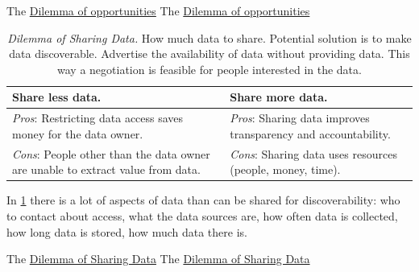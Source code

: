 The \href{table:new-opportunties}{Dilemma of opportunities}
The \href{table:new-opportunties}{Dilemma of opportunities}


\begin{center}
\begin{table}[H] %
\begin{tabular}{ | m{\dilemmatablewidth}| m{\dilemmatablewidth} | } 
  \hline
  \textbf{Share less data.} &
  \textbf{Share more data.} \\
  \hline
  \textit{Pros}: Restricting data access saves money for the data owner.&
  \textit{Pros}: Sharing data improves transparency and accountability. \\
  \hline
  \textit{Cons}: People other than the data owner are unable to extract value from data. & 
  \textit{Cons}: Sharing data uses resources (people, money, time). \\
  \hline
\end{tabular}
\caption{
\textit{Dilemma of Sharing Data.}
How much data to share. Potential solution is to make data discoverable. Advertise the availability of data without providing data. This way a negotiation is feasible for people interested in the data.
}
\label{table:data_share-vs-hide}
\end{table}
\end{center}

In \ref{table:data_share-vs-hide} there is a lot of aspects of data than can be shared for discoverability: who to contact about access, what the data sources are, how often data is collected, how long data is stored, how much data there is.

The \href{table:data_share-vs-hide}{Dilemma of Sharing Data}
The \href{table:data_share-vs-hide}{Dilemma of Sharing Data}


